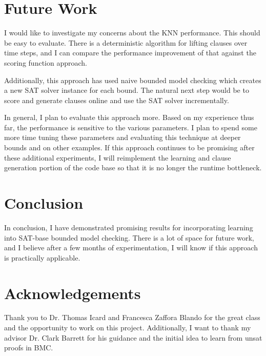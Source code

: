 \documentclass[letterpaper]{article} %
\begin{document}
\section{Future Work}

I would like to investigate my concerns about the KNN performance. This should be easy to evaluate. There is a deterministic algorithm for lifting clauses over time steps, and I can compare the performance improvement of that against the scoring function approach.

Additionally, this approach has used naive bounded model checking which creates a new SAT solver instance for each bound. The natural next step would be to score and generate clauses online and use the SAT solver incrementally.

In general, I plan to evaluate this approach more. Based on my experience thus far, the performance is sensitive to the various parameters. I plan to spend some more time tuning these parameters and evaluating this technique at deeper bounds and on other examples. If this approach continues to be promising after these additional experiments, I will reimplement the learning and clause generation portion of the code base so that it is no longer the runtime bottleneck.

\section{Conclusion}

In conclusion, I have demonstrated promising results for incorporating learning into SAT-base bounded model checking. There is a lot of space for future work, and I believe after a few months of experimentation, I will know if this approach is practically applicable.

\section{Acknowledgements}

Thank you to Dr. Thomas Icard and Francesca Zaffora Blando for the great class and the opportunity to work on this project. Additionally, I want to thank my advisor Dr. Clark Barrett for his guidance and the initial idea to learn from unsat proofs in BMC. 



\end{document}
